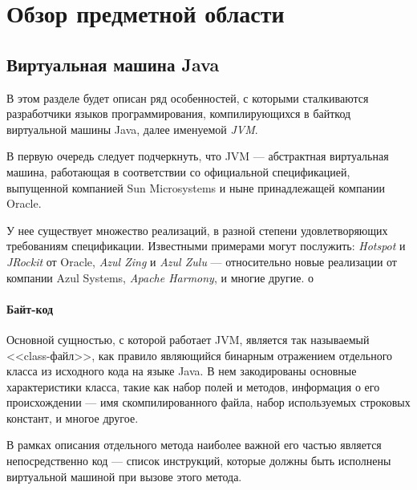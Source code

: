 \section{Обзор предметной области}

\subsection{Виртуальная машина Java}

В этом разделе будет описан ряд особенностей, с которыми сталкиваются разработчики языков
программирования, компилирующихся в байткод виртуальной машины Java, далее именуемой \textit{JVM}.

В первую очередь следует подчеркнуть, что JVM --- абстрактная виртуальная машина, работающая
в соответствии со официальной спецификацией\cite{JVMSpec}, выпущенной компанией Sun Microsystems и ныне
принадлежащей компании Oracle.

У нее существует множество реализаций, в разной степени удовлетворяющих требованиям спецификации.
Известными примерами могут послужить: \textit{Hotspot} и \textit{JRockit} от Oracle, \textit{Azul Zing}
и \textit{Azul Zulu} --- относительно новые реализации от компании Azul Systems, \textit{Apache Harmony},
и многие другие.
о
\paragraph{Байт-код}

Основной сущностью, с которой работает JVM, является так называемый <<class-файл>>, как правило являющийся
бинарным отражением отдельного класса из исходного кода на языке Java. В нем закодированы основные
характеристики класса, такие как набор полей и методов, информация о его происхождении --- имя
скомпилированного файла, набор используемых строковых констант, и многое другое.

В рамках описания отдельного метода наиболее важной его частью является непосредственно код --- список
инструкций, которые должны быть исполнены виртуальной машиной при вызове этого метода.

